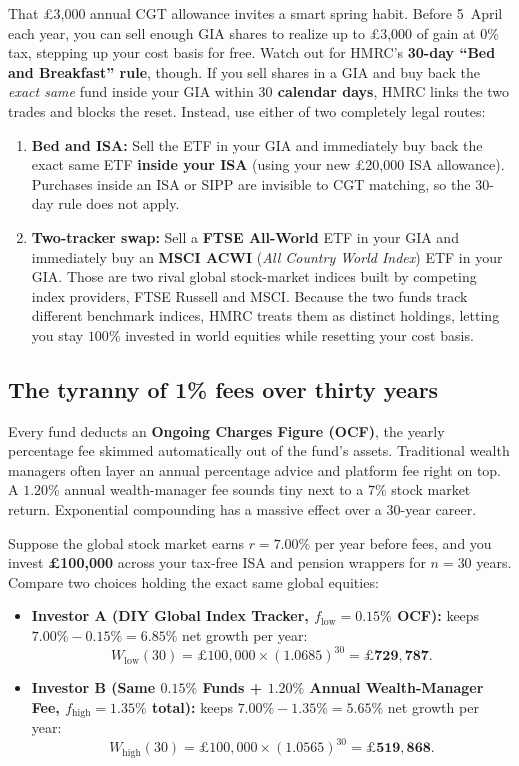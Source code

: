 That \pounds 3,000 annual CGT allowance
 invites a smart spring habit. Before 5~April each year, you can sell enough GIA shares to realize up to \pounds 3,000 of gain at $0\%$ tax, stepping up your cost basis for free. Watch out for HMRC's \textbf{30-day ``Bed and Breakfast'' rule}, though. If you sell shares in a GIA and buy back the \emph{exact same} fund inside your GIA within \textbf{$30$ calendar days}, HMRC links the two trades and blocks the reset. Instead, use either of two completely legal routes:
\begin{enumerate}
  \item \textbf{Bed and ISA:} Sell the ETF in your GIA and immediately buy back the exact same ETF \textbf{inside your ISA} (using your new \pounds 20,000 ISA allowance). Purchases inside an ISA or SIPP are invisible to CGT matching, so the $30$-day rule does not apply.
  \item \textbf{Two-tracker swap:} Sell a \textbf{FTSE All-World} ETF in your GIA and immediately buy an \textbf{MSCI ACWI} (\emph{All Country World Index}) ETF in your GIA. Those are two rival global stock-market indices built by competing index providers, FTSE Russell and MSCI. Because the two funds track different benchmark indices, HMRC treats them as distinct holdings, letting you stay $100\%$ invested in world equities while resetting your cost basis.
\end{enumerate}

\subsection{The tyranny of 1\% fees over thirty years}

Every fund deducts an \textbf{Ongoing Charges Figure (OCF)}, the yearly percentage fee skimmed automatically out of the fund's assets. Traditional wealth managers often layer an annual percentage advice and platform fee right on top. A $1.20\%$ annual wealth-manager fee sounds tiny next to a $7\%$ stock market return. Exponential compounding has a massive effect over a $30$-year career.

Suppose the global stock market earns $r = 7.00\%$ per year before fees, and you invest \textbf{\pounds 100,000} across your tax-free ISA and pension wrappers for $n = 30$ years. Compare two choices holding the exact same global equities:
\begin{itemize}
  \item \textbf{Investor A (DIY Global Index Tracker, $f_{\text{low}} = 0.15\%$ OCF):} keeps $7.00\% - 0.15\% = 6.85\%$ net growth per year:
  \[
    W_{\text{low}}(30) = \pounds 100{,}000 \times (1.0685)^{30} = \mathbf{\pounds 729{,}787}.
  \]
  \item \textbf{Investor B (Same $0.15\%$ Funds + $1.20\%$ Annual Wealth-Manager Fee, $f_{\text{high}} = 1.35\%$ total):} keeps $7.00\% - 1.35\% = 5.65\%$ net growth per year:
  \[
    W_{\text{high}}(30) = \pounds 100{,}000 \times (1.0565)^{30} = \mathbf{\pounds 519{,}868}.
  \]
\end{itemize}

